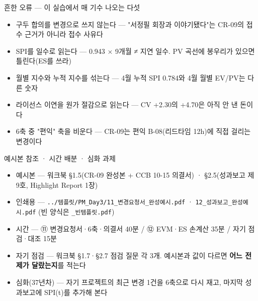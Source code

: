 \begin{frame}{흔한 오류 — 이 실습에서 매 기수 나오는 다섯}
\begin{itemize}
\item 구두 합의를 변경으로 쓰지 않는다 — "서정필 회장과 이야기됐다"는 CR-09의 접수 근거가 아니라 접수 사유다
\item SPI를 일수로 읽는다 — 0.943 × 9개월 ≠ 지연 일수. PV 곡선에 봉우리가 있으면 틀린다(ES를 쓰라)
\item 월별 지수와 누적 지수를 섞는다 — 4월 누적 SPI 0.784와 4월 월별 EV/PV는 다른 숫자
\item 라이선스 이연을 원가 절감으로 읽는다 — CV +2.30의 +4.70은 아직 안 낸 돈이다
\item 6축 중 "편익" 축을 비운다 — CR-09는 편익 B-08(리드타임 12h)에 직접 걸리는 변경이다
\end{itemize}
\end{frame}

\begin{frame}{예시본 참조 · 시간 배분 · 심화 과제}
\begin{itemize}
\item 예시본 — 워크북 §1.5(CR-09 완성본 + CCB 10-15 의결서) · §2.5(성과보고 제9호, Highlight Report 1장)
\item 인쇄용 — \texttt{../템플릿/PM\_Day3/11\_변경요청서\_완성예시.pdf} · \texttt{12\_성과보고\_완성예시.pdf} (빈 양식은 \texttt{\_빈템플릿.pdf})
\item 시간 — ⑪ 변경요청서·6축·의결서 40분 / ⑫ EVM·ES 손계산 35분 / 자기 점검·대조 15분
\item 자기 점검 — 워크북 §1.7·§2.7 점검 질문 각 3개. 예시본과 값이 다르면 \textbf{어느 전제가 달랐는지}를 적는다
\item 심화(3\til{}7년차) — 자기 프로젝트의 최근 변경 1건을 6축으로 다시 재고, 마지막 성과보고에 SPI(t)를 추가해 본다
\end{itemize}
\end{frame}

